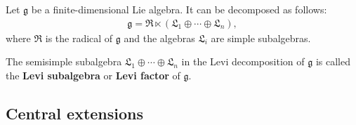     \begin{theorem}
        Let $\mathfrak{g}$ be a finite-dimensional Lie algebra. It can be decomposed as follows:
        \begin{gather}
            \mathfrak{g} = \mathfrak{R}\ltimes(\mathfrak{L}_1\oplus\cdots \oplus\mathfrak{L}_n),
        \end{gather}
        where $\mathfrak{R}$ is the radical of $\mathfrak{g}$ and the algebras $\mathfrak{L}_i$ are simple subalgebras.
    \end{theorem}
    \begin{definition}
        The semisimple subalgebra $\mathfrak{L}_1\oplus\cdots\oplus\mathfrak{L}_n$ in the Levi decomposition of $\mathfrak{g}$ is called the \textbf{Levi subalgebra} or \textbf{Levi factor} of $\mathfrak{g}$.
    \end{definition}

\subsection{Central extensions}\label{section:central_extension_algebra}


